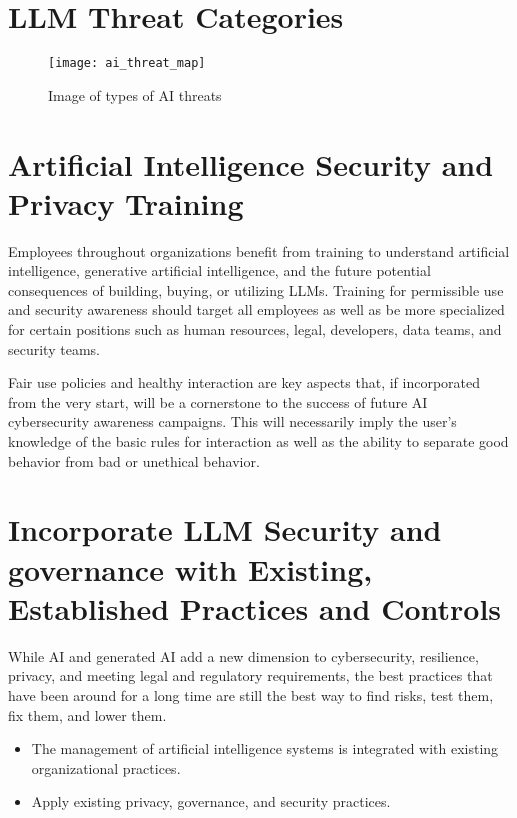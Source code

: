 \clearpage

\section{LLM Threat Categories}

\begin{figure}[h]
  \centering
  \texttt{[image: ai\_threat\_map]}
  \caption{Image of types of AI threats}
  \label{fig:ai-threat-map}
\end{figure}

\section{Artificial Intelligence Security and Privacy Training}

Employees throughout organizations benefit from training to understand
artificial intelligence, generative artificial intelligence, and the future
potential consequences of building, buying, or utilizing LLMs. Training for
permissible use and security awareness should target all employees as well as
be more specialized for certain positions such as human resources, legal,
developers, data teams, and security teams.

Fair use policies and healthy interaction are key aspects that, if incorporated
from the very start, will be a cornerstone to the success of future AI
cybersecurity awareness campaigns. This will necessarily imply the user's
knowledge of the basic rules for interaction as well as the ability to separate
good behavior from bad or unethical behavior.

\section{Incorporate LLM Security and governance with Existing, Established Practices and Controls}

While AI and generated AI add a new dimension to cybersecurity, resilience,
privacy, and meeting legal and regulatory requirements, the best practices that
have been around for a long time are still the best way to find risks, test
them, fix them, and lower them.

\begin{itemize}
  \item The management of artificial intelligence systems is integrated with
  existing organizational practices.
  \item Apply existing privacy, governance, and security practices.
\end{itemize}

